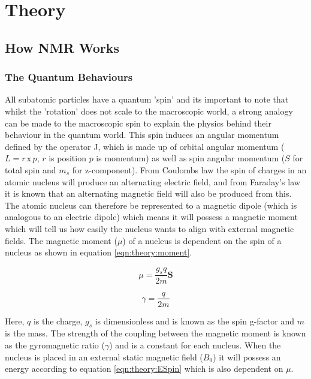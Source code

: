 \chapter{Theory}
\label{Chap:Theory}

\section{How \ac{NMR} Works}
\subsection{The Quantum Behaviours}

All subatomic particles have a quantum 'spin' and its important to note that whilst the 'rotation' does not scale to the macroscopic world, a strong analogy can be made to the macroscopic spin to explain the physics behind their behaviour in the quantum world. This spin induces an angular momentum defined by the operator J, which is made up of orbital angular momentum ($L = r\, \textrm{x} \, p$, $r$ is position $p$ is momentum) as well as spin angular momentum ($S$ for total spin and $m_s$ for z-component). From Coulombs law \cite{Coulomb1785PremierMagnetisme} the spin of charges in an atomic nucleus will produce an alternating electric field, and from Faraday's law \cite{Faraday1821OnMagnetism} it is known that an alternating magnetic field will also be produced from this. The atomic nucleus can therefore be represented to a magnetic dipole (which is analogous to an electric dipole) which means it will possess a magnetic moment which will tell us how easily the nucleus wants to align with external magnetic fields. The magnetic moment ($\mu$) of a nucleus is dependent on the spin of a nucleus as shown in equation \ref{eqn:theory:moment}.

\begin{equation}
    \mu = \frac{g_sq}{2m} \mathbf{S}
    \label{eqn:theory:moment}
\end{equation}

\begin{equation}
    \gamma = \frac{q}{2m}
    \label{eqn:theory:gyro}
\end{equation}

Here, $q$ is the charge, $g_s$ is dimensionless and is known as the spin g-factor and $m$ is the mass. The strength of the coupling between the magnetic moment is known as the gyromagnetic ratio ($\gamma$) and is a constant for each nucleus. When the nucleus is placed in an external static magnetic field ($B_0$) it will possess an energy according to equation \ref{eqn:theory:ESpin} which is also dependent on $\mu$.

